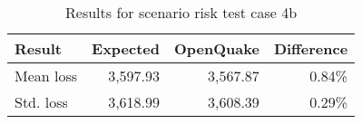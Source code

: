 \begin{table}[htbp]

\centering
\begin{tabular}{ l r r r }

\hline
\rowcolor{anti-flashwhite}
\bf{Result} & \bf{Expected} & \bf{OpenQuake} & \bf{Difference}\\
\hline
Mean loss & 3,597.93 & 3,567.87 & 0.84\% \\
Std. loss & 3,618.99 & 3,608.39 & 0.29\% \\
\hline
\end{tabular}

\caption{Results for scenario risk test case 4b}
\label{tab:result-scenario-risk-4b}
\end{table}